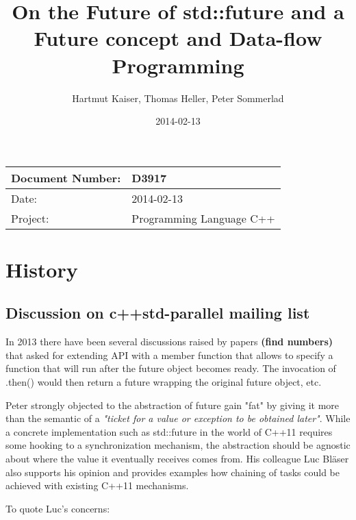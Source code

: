 \documentclass[ebook,11pt,article]{memoir}
\title{On the Future of std::future and a Future concept and Data-flow Programming}
\author{Hartmut Kaiser, Thomas Heller, Peter Sommerlad}
\date{2014-02-13}                                           %
\begin{document}
\maketitle
\begin{tabular}[t]{|l|l|}\hline 
Document Number: & D3917 \\\hline
Date: & 2014-02-13 \\\hline
Project: & Programming Language C++\\\hline 
\end{tabular}
\chapter{History}
\section{Discussion on c++std-parallel mailing list}

In 2013 there have been several discussions raised by papers \textbf{(find numbers)} that asked for extending  API with a member function  that allows to specify a function that will run after the future object becomes ready. The invocation of .then() would then return a future wrapping the original future object, etc. 

Peter strongly objected to the abstraction of future gain "fat" by giving it more than the semantic of a \emph{"ticket for a value or exception to be obtained later"}. While a concrete implementation such as std::future in the world of C++11 requires some hooking to a synchronization mechanism, the abstraction should be agnostic about where the value it eventually receives comes from. His colleague Luc Bläser also supports his opinion and provides examples how chaining of tasks could be achieved with existing C++11 mechanisms.

To quote Luc's concerns:
\end{document}
